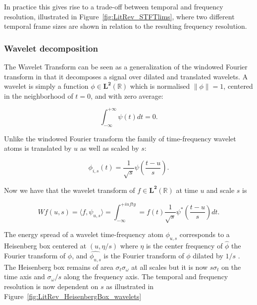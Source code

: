 In practice this gives rise to a trade-off between temporal and frequency resolution, illustrated in Figure~\ref{fig:LitRev_STFTlims}, where two different temporal frame sizes are shown in relation to the resulting frequency resolution.

\subsubsection{Wavelet decomposition}
The Wavelet Transform can be seen as a generalization of the windowed Fourier transform in that it decomposes a signal over dilated and translated wavelets. A wavelet is simply a function $\phi \in \mathbf{L^2}(\mathbb{R})$ which is normalised $\| \phi \| = 1$, centered in the neighborhood of $t=0$, and with zero average:

\begin{equation}\label{eq:Mallat1999_4}
\int^{+\infty}_{-\infty} \psi(t) dt = 0.
\end{equation}

Unlike the windowed Fourier transform the family of time-frequency wavelet atoms is translated by $u$ as well as scaled by $s$:

\begin{equation}\label{eq:Mallat1999_5}
\phi_{i,s}(t) = \frac{1}{\sqrt{s}}\psi\left(\frac{t-u}{s}\right).
\end{equation}

Now we have that the wavelet transform of $f \in \mathbf{L^2}(\mathbb{R})$ at time $u$ and scale $s$ is

\begin{equation}\label{eq:Mallat1999_x}
W f(u,s) = \langle f, \psi_{u,s} \rangle = \int^{+infty}_{-\infty} = f(t) \frac{1}{\sqrt{s}}\psi^\ast \left( \frac{t-u}{s} \right) dt.
\end{equation}


The energy spread of a wavelet time-frequency atom $\phi_{u,s}$ corresponds to a Heisenberg box centered at $(u,\eta/s)$ where $\eta$ is the center frequency of $\hat{\phi}$ the Fourier transform of $\phi$, and $\hat{\phi_{u,s}}$ is the Fourier transform of $\phi$ dilated by $1/s$ . The Heisenberg box remains of area $\sigma_t \sigma_\omega$ at all scales but it is now $s\sigma_t$ on the time axis and $\sigma_\omega /s$ along the frequency axis. The temporal and frequency resolution is now dependent on $s$ as illustrated in Figure~\ref{fig:LitRev_HeisenbergBox_wavelets}

